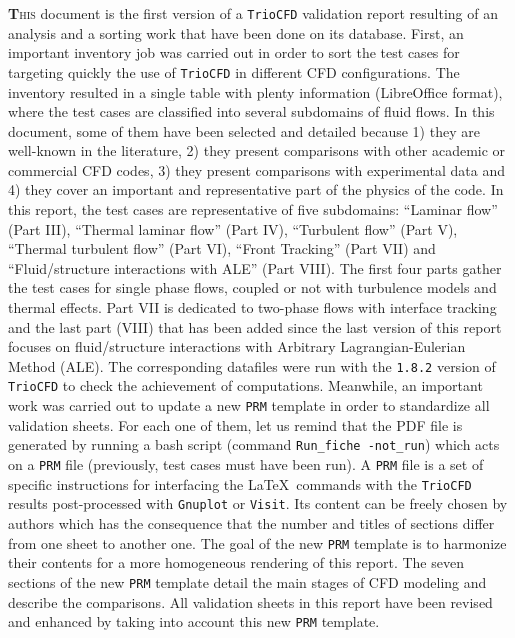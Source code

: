 \lettrine[lines=2,slope=0pt,nindent=4pt]{\textbf{T}}{his} document
is the first version of a \texttt{TrioCFD} validation report resulting
of an analysis and a sorting work that have been done on its database.
First, an important inventory job was carried out in order to sort
the test cases for targeting quickly the use of \texttt{TrioCFD}
in different CFD configurations. The inventory resulted in a single
table with plenty information (LibreOffice format), where the test
cases are classified into several subdomains of fluid flows. In this
document, some of them have been selected and detailed because 1)
they are well-known in the literature, 2) they present comparisons
with other academic or commercial CFD codes, 3) they present comparisons
with experimental data and 4) they cover an important and representative part of the
physics of the code. In this report, the test cases are representative
of five subdomains: ``Laminar flow'' (Part III), ``Thermal laminar
flow'' (Part IV), ``Turbulent flow'' (Part V), ``Thermal turbulent
flow'' (Part VI), ``Front Tracking'' (Part VII) and ``Fluid/structure interactions with ALE'' (Part VIII).
The first four parts gather the test cases for single phase flows, coupled or not with
turbulence models and thermal effects. Part VII is dedicated
to two-phase flows with interface tracking and the last part (VIII) that has been added since
the last version of this report focuses on fluid/structure interactions with Arbitrary
Lagrangian-Eulerian Method (ALE). The corresponding datafiles
were run with the \texttt{1.8.2} version of \texttt{TrioCFD}
to check the achievement of computations. Meanwhile, an important
work was carried out to update a new \texttt{PRM} template in order
to standardize all validation sheets. For each one of them, let us
remind that the PDF file is generated by running a bash script (command
\texttt{Run\_fiche -not\_run}) which acts on a \texttt{PRM} file (previously, test cases must have
been run). A \texttt{PRM} file is a set of specific instructions for interfacing
the \LaTeX ~commands with the \texttt{TrioCFD} results post-processed
with \texttt{Gnuplot} or \texttt{Visit}. Its content can be freely
chosen by authors which has the consequence that the number and titles
of sections differ from one sheet to another one. The goal of the
new \texttt{PRM} template is to harmonize their contents for a more
homogeneous rendering of this report. The seven sections of the new
\texttt{PRM} template detail the main stages of CFD modeling and describe
the comparisons. All validation sheets in this report have been revised
and enhanced by taking into account this new \texttt{PRM} template.

